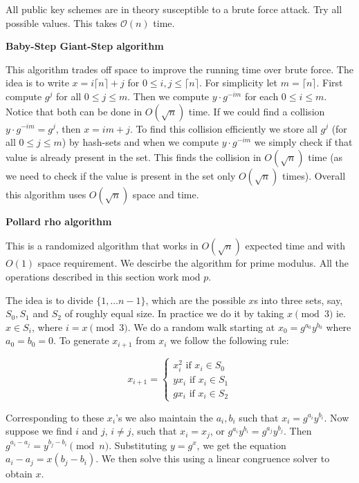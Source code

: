 \documentclass{article}
\begin{document}
All public key schemes are in theory susceptible to a brute force attack. Try all possible values. This takes $\mathcal{O}(n)$ time.

\begin{center}
    \textbf{Baby-Step Giant-Step algorithm}
\end{center}

This algorithm trades off space to improve the running time over brute force. The idea is to write $x = i\lceil n \rceil + j$ for $0 \le i,j \le \lceil n \rceil$. For simplicity let $m = \lceil n \rceil$. First compute $g^j$ for all $0 \le j \le m$. Then we compute $y\cdot g^{-im}$ for each $0 \le i \le m$. Notice that both can be done in $O(\sqrt n )$ time. If we could find a collision $y\cdot g^{-im} = g^j$, then $x = im + j$. To find this collision efficiently we store all $g^j$ (for all $0 \le j \le m$) by hash-sets and when we compute $y\cdot g^{-im}$ we simply check if that value is already present in the set. This finds the collision in $O(\sqrt{n})$ time (as we need to check if the value is present in the set only $O(\sqrt{n})$ times). Overall this algorithm uses $O(\sqrt{n})$ space and time.

\begin{center}
    \textbf{Pollard rho algorithm}
\end{center}


This is a randomized algorithm that works in $O(\sqrt{n})$ expected time and with $O(1)$ space requirement. We descirbe the algorithm for prime modulus. All the operations described in this section work mod $p$.

The idea is to divide $\{1, \dots n-1\}$, which are the possible $x$s into three sets, say, $S_0, S_1$ and $S_2$ of roughly equal size. In practice we do it by taking $x \pmod 3$ ie. $x \in S_i$, where $i = x \pmod 3$. We do a random walk starting at $x_0 = g^{a_0} y^{b_0}$ where $a_0 = b_0 = 0$. To generate $x_{i+1}$ from $x_i$ we follow the following rule:

\begin{equation*}
    x_{i+1} = 
    \begin{cases}
        x_i^2 \text{ if } x_i \in S_0 \\
        yx_i \text{ if } x_i \in S_1 \\
        gx_i \text{ if } x_i \in S_2
    \end{cases}
\end{equation*}

Corresponding to these $x_i$'s we also maintain the $a_i, b_i$ such that $x_i = g^{a_i} y^{b_i}$. Now suppose we find $i$ and $j$, $i \neq j$, such that $x_i = x_j$, or $g^{a_i} y^{b_i} = g^{a_j} y^{b_j}$. Then $g^{a_i - a_j} = y^{b_j - b_i} \pmod n$. Substituting $y = g^x$, we get the equation $a_i - a_j = x (b_j - b_i)$. We then solve this using a linear congruence solver to obtain $x$.
\end{document}
